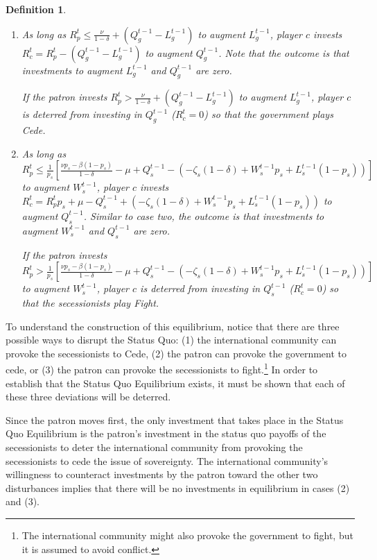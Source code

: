 \documentclass[11pt,letterpaper, notitlepage]{article}
\newtheorem{definition}{Definition}
\newcommand{\de}{\delta}
\begin{document}
\begin{definition}
\begin{enumerate}
	\item As long as $R_p^t \leq \frac{\nu}{1-\de} + \left( Q_g^{t-1} - L_g^{t-1}\right)$ to augment $L_g^{t-1}$, player $c$ invests $R_c^t = R_p^t - \left( Q_g^{t-1} - L_g^{t-1}\right)$ to augment $Q_g^{t-1}$. Note that the outcome is that investments to augment $L_g^{t-1}$ and $Q_g^{t-1}$ are zero.

If the patron invests $R_p^t > \frac{\nu}{1-\de} + \left( Q_g^{t-1} - L_g^{t-1}\right)$ to augment $L_g^{t-1}$, player $c$ is deterred from investing in $Q_g^{t-1}$ ($R_c^t = 0$) so that the government plays Cede.

	\item As long as $R_p^t \leq \frac{1}{p_s} \left[\frac{\nu p_s - \beta (1-p_s)}{1 -\de} - \mu + Q_s^{t-1} - \left(-\zeta_{s}(1-\de) + W_s^{t-1}p_s + L_s^{t-1}(1-p_s)\right)\right]$ to augment $W_s^{t-1}$, player $c$ invests $R_c^t = R_p^tp_s + \mu - Q_s^{t-1} + \left(-\zeta_{s}(1-\de) + W_s^{t-1}p_s + L_s^{t-1}(1-p_s)\right)$ to augment $Q_s^{t-1}$. Similar to case two, the outcome is that investments to augment $W_s^{t-1}$ and $Q_s^{t-1}$ are zero.

If the patron invests $R_p^t > \frac{1}{p_s}\left[\frac{\nu p_s - \beta (1-p_s)}{1 -\de} - \mu + Q_s^{t-1} - \left(-\zeta_{s}(1-\de) + W_s^{t-1}p_s + L_s^{t-1}(1-p_s)\right)\right] $ to augment $W_s^{t-1}$, player $c$ is deterred from investing in $Q_s^{t-1}$ ($R_c^t=0$) so that the secessionists play Fight.
\end{enumerate}
\end{definition}

To understand the construction of this equilibrium, notice that there are three possible ways to disrupt the Status Quo: (1) the international community can provoke the secessionists to Cede, (2) the patron can provoke the government to cede, or (3) the patron can provoke the secessionists to fight.\footnote{The international community might also provoke the government to fight, but it is assumed to avoid conflict.} In order to establish that the Status Quo Equilibrium exists, it must be shown that each of these three deviations will be deterred.

Since the patron moves first, the only investment that takes place in the Status Quo Equilibrium is the patron's investment in the status quo payoffs of the secessionists to deter the international community from provoking the secessionists to cede the issue of sovereignty. The international community's willingness to counteract investments by the patron toward the other two disturbances implies that there will be no investments in equilibrium in cases (2) and (3).
\end{document}
